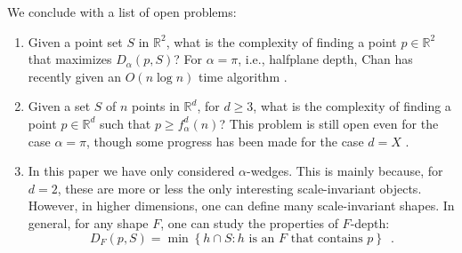 \documentclass[lotsofwhite]{patmorin}
\begin{document}
We conclude with a list of open problems:

\begin{enumerate}
\item Given a point set $S$ in $\mathbb{R}^2$, what is the complexity
of finding a point $p\in\mathbb{R}^2$ that maximizes $D_\alpha(p,S)$?
For $\alpha=\pi$, i.e., halfplane depth, Chan has recently given an
$O(n\log n)$ time algorithm \cite{c04}.

\item Given a set $S$ of $n$ points in $\mathbb{R}^d$, for $d\ge 3$,
what is the complexity of finding a point $p\in \mathbb{R}^d$ such
that $p\ge f_\alpha^d(n)$?  This problem is still open even for the
case $\alpha=\pi$, though some progress has been made for the case
$d=X$ \cite{X}.

\item In this paper we have only considered $\alpha$-wedges.  This is
mainly because, for $d=2$, these are more or less the only interesting
scale-invariant objects.  However, in higher dimensions, one can
define many scale-invariant shapes.  In general, for any shape $F$,
one can study the properties of $F$-depth:
\[
  D_F(p,S) = \min\left\{ 
     h\cap S : \mbox{$h$ is an $F$ that contains $p$}
  \right\} \enspace .
\] 
\end{enumerate}





\end{document}
